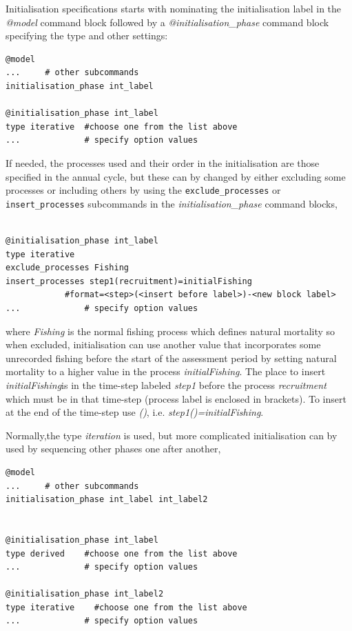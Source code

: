 Initialisation specifications starts with nominating the initialisation label in the \textit{@model} command block followed by a \textit{@initialisation\_phase} command block specifying the type and other settings:

{\small{\begin{verbatim}
@model
...     # other subcommands
initialisation_phase int_label

@initialisation_phase int_label
type iterative  #choose one from the list above
...             # specify option values

\end{verbatim}}}

If needed, the processes used and their order in the initialisation are those specified in the annual cycle, but these can by changed by either excluding some processes or including others by using the  \texttt{exclude\_processes} or  \texttt{insert\_processes} subcommands in the \textit{initialisation\_phase} command blocks,

{\small{\begin{verbatim}

@initialisation_phase int_label
type iterative  
exclude_processes Fishing
insert_processes step1(recruitment)=initialFishing 
            #format=<step>(<insert before label>)-<new block label>
...             # specify option values

\end{verbatim}}}

where \textit{ Fishing} is the normal fishing process which defines natural mortality so when excluded, initialisation can use another value that incorporates some unrecorded fishing before the start of the assessment period by setting natural mortality to a higher value in the process \textit{initialFishing}. The place to insert \textit{initialFishing}is in the time-step labeled \textit{step1} before the process \textit{recruitment} which must be in that time-step (process label is enclosed in brackets). To insert at the end of the time-step use \textit{()}, i.e. \textit{step1()=initialFishing}.

Normally,the type \textit{iteration} is used, but more complicated initialisation can by used by sequencing other phases one after another,

{\small{\begin{verbatim}
@model
...     # other subcommands
initialisation_phase int_label int_label2


@initialisation_phase int_label
type derived    #choose one from the list above
...             # specify option values

@initialisation_phase int_label2
type iterative    #choose one from the list above
...             # specify option values

\end{verbatim}}}


